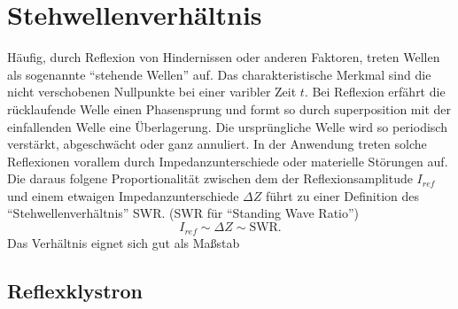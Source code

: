 \section{Stehwellenverhältnis}  %
Häufig, durch Reflexion von Hindernissen oder anderen Faktoren, treten Wellen als sogenannte \enquote{stehende Wellen} auf. Das charakteristische Merkmal sind die nicht verschobenen Nullpunkte bei einer varibler Zeit $t$.
Bei Reflexion erfährt die rücklaufende Welle einen Phasensprung und formt so durch superposition mit der einfallenden Welle eine Überlagerung. Die ursprüngliche Welle wird so periodisch verstärkt, abgeschwächt oder ganz annuliert. 
In der Anwendung treten solche Reflexionen vorallem durch Impedanzunterschiede oder materielle Störungen auf. Die daraus folgene Proportionalität zwischen dem der Reflexionsamplitude $I_{ref}$ und einem etwaigen Impedanzunterschiede $\Delta Z$
führt zu einer Definition des \enquote{Stehwellenverhältnis} SWR. (SWR für \enquote{Standing Wave Ratio}) 
\begin{equation}
    I_{ref} \sim \Delta Z \sim \text{SWR}.
\end{equation}
Das Verhältnis eignet sich gut als Maßstab

\subsection{Reflexklystron}


